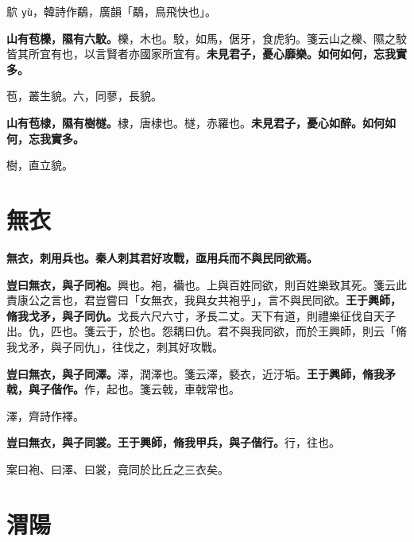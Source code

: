 \begin{quoting}鴥 \texttt{yù}，韓詩作鷸，廣韻「鷸，鳥飛快也」。\end{quoting}

\textbf{山有苞櫟，隰有六駮。}{\footnotesize 櫟，木也。駮，如馬，倨牙，食虎豹。箋云山之櫟、隰之駮皆其所宜有也，以言賢者亦國家所宜有。}\textbf{未見君子，憂心靡樂。如何如何，忘我實多。}

\begin{quoting}苞，叢生貌。六，同蓼，長貌。\end{quoting}

\textbf{山有苞棣，隰有樹檖。}{\footnotesize 棣，唐棣也。檖，赤羅也。}\textbf{未見君子，憂心如醉。如何如何，忘我實多。}

\begin{quoting}樹，直立貌。\end{quoting}

\section{無衣}


\textbf{無衣，刺用兵也。秦人刺其君好攻戰，亟用兵而不與民同欲焉。}

\textbf{豈曰無衣，與子同袍。}{\footnotesize 興也。袍，襺也。上與百姓同欲，則百姓樂致其死。箋云此責康公之言也，君豈嘗曰「女無衣，我與女共袍乎」，言不與民同欲。}\textbf{王于興師，脩我戈矛，與子同仇。}{\footnotesize 戈長六尺六寸，矛長二丈。天下有道，則禮樂征伐自天子出。仇，匹也。箋云于，於也。怨耦曰仇。君不與我同欲，而於王興師，則云「脩我戈矛，與子同仇」，往伐之，刺其好攻戰。}

\textbf{豈曰無衣，與子同澤。}{\footnotesize 澤，潤澤也。箋云澤，褻衣，近汙垢。}\textbf{王于興師，脩我矛戟，與子偕作。}{\footnotesize 作，起也。箋云戟，車戟常也。}

\begin{quoting}澤，齊詩作襗。\end{quoting}

\textbf{豈曰無衣，與子同裳。王于興師，脩我甲兵，與子偕行。}{\footnotesize 行，往也。}

\begin{quoting}案曰袍、曰澤、曰裳，竟同於比丘之三衣矣。\end{quoting}

\section{渭陽}

